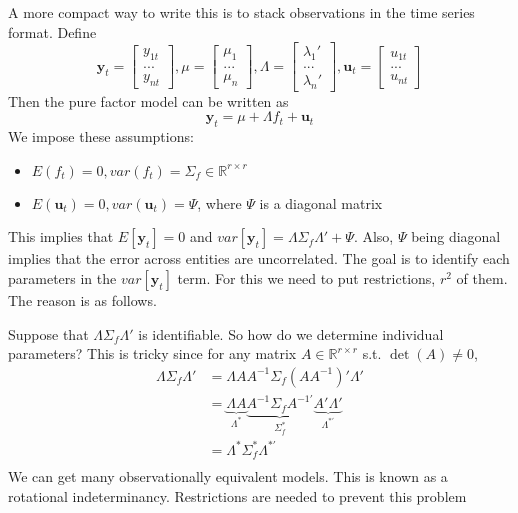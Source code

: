 \documentclass[12pt]{article}
\theoremstyle{definition}
\theoremstyle{property}
\theoremstyle{assumption}
\theoremstyle{example}
\theoremstyle{comment}
\begin{document}
A more compact way to write this is to stack observations in the time series format. Define
\[
\mathbf{y}_t = \begin{bmatrix}y_{1t}\\...\\y_{nt}\end{bmatrix}, \mu= \begin{bmatrix}\mu_{1}\\...\\ \mu_{n}\end{bmatrix}, \Lambda =  \begin{bmatrix}\lambda_{1}'\\...\\ \lambda_{n}'\end{bmatrix}, \mathbf{u}_t = \begin{bmatrix}u_{1t}\\...\\u_{nt}\end{bmatrix}
\]
Then the pure factor model can be written as
\[
\mathbf{y}_t = \mu+\Lambda f_t+\mathbf{u}_t 
\]
We impose these assumptions:
\begin{itemize}
\item $E(f_t)=0, var(f_t)=\Sigma_f\in\mathbb{R}^{r\times r}$
\item $E(\mathbf{u}_t)=0, var(\mathbf{u}_t)=\Psi$, where $\Psi$ is a diagonal matrix
\end{itemize}
This implies that $E[\mathbf{y}_t]=0$ and $var[\mathbf{y}_t]=\Lambda \Sigma_f \Lambda'+\Psi$. Also, $\Psi$ being diagonal implies that the error across entities are uncorrelated. The goal is to identify each parameters in the $var[\mathbf{y}_t]$ term. For this we need to put restrictions, $r^2$ of them. The reason is as follows. \par
Suppose that $\Lambda\Sigma_f\Lambda'$ is identifiable. So how do we determine individual parameters? This is tricky since for any matrix $A\in\mathbb{R}^{r\times r}$ s.t. $\det(A)\neq0$, 
\begin{align*}
\Lambda \Sigma_f \Lambda'&=\Lambda AA^{-1}\Sigma_f( AA^{-1})' \Lambda'\\
&=\underbrace{\Lambda A}_{\Lambda^*}\underbrace{A^{-1}\Sigma_fA^{-1'}}_{\Sigma_f^*}\underbrace{A' \Lambda'}_{\Lambda^{*'}}\\
&=\Lambda^* \Sigma_f^* \Lambda^{*'}\\
\end{align*}
We can get many observationally equivalent models. This is known as a rotational indeterminancy. Restrictions are needed to prevent this problem
\end{document}
